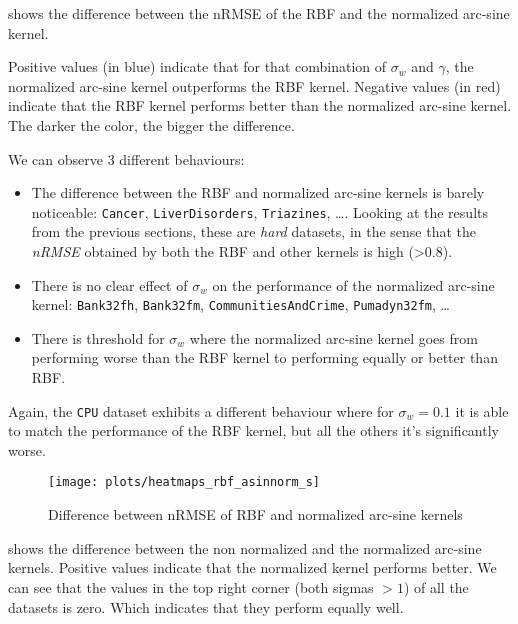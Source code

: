  shows the difference between the nRMSE of the
RBF and the normalized arc-sine kernel.

Positive values (in blue) indicate that for that
combination of $\sigma_w$ and $\gamma$, the normalized arc-sine kernel
outperforms the RBF kernel.
Negative values (in red) indicate that the RBF
kernel performs better than the normalized arc-sine kernel.
The darker the color, the bigger the difference.

We can observe 3 different behaviours:
\begin{itemize}
    \item The difference between the RBF and normalized arc-sine
          kernels is barely noticeable: \texttt{Cancer}, \texttt{LiverDisorders},
          \texttt{Triazines}, \dots. Looking at the results from the previous
          sections, these are \emph{hard} datasets, in the sense that the
          \emph{nRMSE} obtained by both the RBF and other kernels is high (>0.8).

    \item There is no clear effect of $\sigma_w$ on the
          performance of the normalized arc-sine kernel: \texttt{Bank32fh},
          \texttt{Bank32fm}, \texttt{CommunitiesAndCrime}, \texttt{Pumadyn32fm}, \dots

    \item There is threshold for $\sigma_w$ where the normalized
          arc-sine kernel goes from performing worse than the RBF kernel to
          performing equally or better than RBF.
\end{itemize}

Again, the \texttt{CPU} dataset exhibits a different behaviour where for
$\sigma_w=0.1$ it is able to match the performance of the RBF kernel, but
all the others it's significantly worse.

\begin{figure}[H]
    \texttt{[image: plots/heatmaps\_rbf\_asinnorm\_s]}
    \caption{Difference between nRMSE of RBF and normalized arc-sine kernels}
    \label{fig:heatmaps-rbf-asinnorm}
\end{figure}

 shows the difference between the non normalized
and the normalized arc-sine kernels. Positive values indicate that the normalized
kernel performs better. We can see that the values in the top right corner (both sigmas $>1$)
of all the datasets is zero. Which indicates that they perform equally well.

